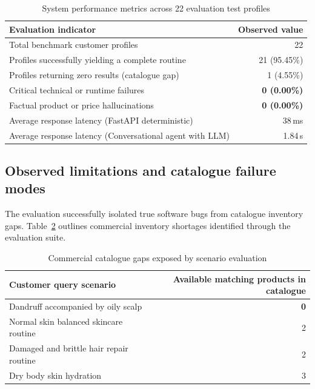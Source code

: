 \begin{table}[H]
\caption{System performance metrics across 22 evaluation test profiles}
\label{tab:validation}
\centering
\begin{tabularx}{\textwidth}{X r}
\toprule
\textbf{Evaluation indicator} & \textbf{Observed value} \\
\midrule
Total benchmark customer profiles & 22 \\
Profiles successfully yielding a complete routine & 21 (95.45\%) \\
Profiles returning zero results (catalogue gap) & 1 (4.55\%) \\
Critical technical or runtime failures & \textbf{0 (0.00\%)} \\
Factual product or price hallucinations & \textbf{0 (0.00\%)} \\
Average response latency (FastAPI deterministic) & 38\,ms \\
Average response latency (Conversational agent with LLM) & 1.84\,s \\
\bottomrule
\end{tabularx}
\end{table}


\subsection{Observed limitations and catalogue failure modes}

The evaluation successfully isolated true software bugs from catalogue inventory gaps. Table~\ref{tab:gaps} outlines commercial inventory shortages identified through the evaluation suite.

\begin{table}[H]
\caption{Commercial catalogue gaps exposed by scenario evaluation}
\label{tab:gaps}
\centering
\begin{tabularx}{\textwidth}{X r}
\toprule
\textbf{Customer query scenario} & \textbf{Available matching products in catalogue} \\
\midrule
Dandruff accompanied by oily scalp & \textbf{0} \\
Normal skin balanced skincare routine & 2 \\
Damaged and brittle hair repair routine & 2 \\
Dry body skin hydration & 3 \\
\bottomrule
\end{tabularx}
\end{table}

